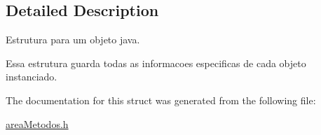 \subsection{Detailed Description}
Estrutura para um objeto java. 

Essa estrutura guarda todas as informacoes especificas de cada objeto instanciado. 

The documentation for this struct was generated from the following file\+:\begin{DoxyCompactItemize}
\item 
\mbox{\hyperlink{areaMetodos_8h}{area\+Metodos.\+h}}\end{DoxyCompactItemize}
